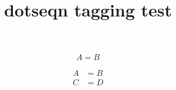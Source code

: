 \documentclass{article}
\title{dotseqn tagging test}
\begin{document}
\begin{equation}
A=B
\end{equation}

\begin{eqnarray}
A &= B \\
C &= D
\end{eqnarray}
\end{document}
